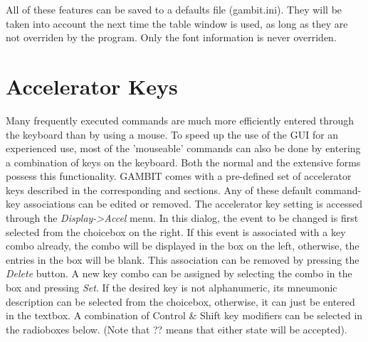 All of these features can be saved to a defaults file (gambit.ini).  They
will be taken into account the next time the table window is used, as long
as they are not overriden by the program.  Only the font information is
never overriden.


\section{Accelerator Keys}\label{Accelerators}

Many frequently executed commands are much more efficiently entered
through the keyboard than by using a mouse.  To speed up the use of the
GUI for an experienced use, most of the 'mouseable' commands can also be
done by entering a combination of keys on the keyboard.  Both the normal
and the extensive forms possess this functionality.  GAMBIT comes with a
pre-defined set of accelerator keys described in the corresponding
 and
 sections.  Any of these default command-key
associations can be edited or removed.  The accelerator key setting is
accessed through the {\em Display->Accel} menu.  In this dialog, the event
to be changed is first selected from the choicebox on the right.  If this
event is associated with a key combo already, the combo will be displayed
in the box on the left, otherwise, the entries in the box will be blank.
This association can be removed by pressing the {\em Delete} button.  A
new key combo can be assigned by selecting the combo in the box and
pressing {\em Set}.  If the desired key is not alphanumeric, its mneumonic
description can be selected from the choicebox, otherwise, it can just be
entered in the textbox.  A combination of Control \& Shift key modifiers
can be selected in the radioboxes below.  (Note that ??  means that either
state will be accepted).

